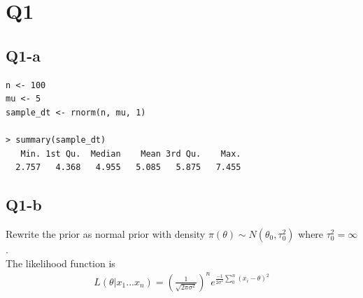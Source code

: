 \documentclass[11pt,letterpaper]{article}
\begin{document}
\section*{Q1}
\subsection*{Q1-a}
\begin{verbatim}
n <- 100
mu <- 5
sample_dt <- rnorm(n, mu, 1)

> summary(sample_dt)
   Min. 1st Qu.  Median    Mean 3rd Qu.    Max. 
  2.757   4.368   4.955   5.085   5.875   7.455 
\end{verbatim}

\subsection*{Q1-b}
\noindent Rewrite the prior as normal prior with density $\pi(\theta) \sim N(\theta_0, \tau_0^2)$ where $\tau_0^2 = \infty$. \\

\noindent The likelihood function is
\begin{align*}
L(\theta | x_1...x_n) = (\frac{1}{\sqrt{2 \pi \sigma^2}})^n e^{\frac{-1}{2 \sigma^2} \sum_0^n (x_i - \theta)^2 }
\end{align*}
\end{document}

